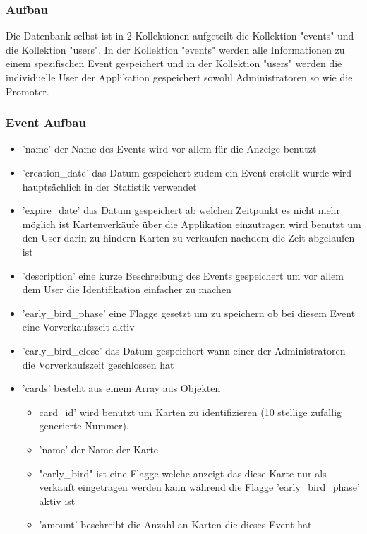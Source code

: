		\newpage
		
		\subsubsection{Aufbau}
			Die Datenbank selbst ist in 2 Kollektionen aufgeteilt die Kollektion "events" und die Kollektion "users". In der Kollektion "events" werden alle Informationen zu einem spezifischen Event gespeichert und in der Kollektion "users" werden die individuelle User der Applikation gespeichert sowohl Administratoren so wie die Promoter. 

			\subsubsection{Event Aufbau}			
				\begin{itemize}
					\item 'name' der Name des Events wird vor allem für die Anzeige benutzt
					\item 'creation\_date' das Datum gespeichert zudem ein Event erstellt wurde wird hauptsächlich in der Statistik verwendet
					\item 'expire\_date' das Datum gespeichert ab welchen Zeitpunkt es nicht mehr möglich ist Kartenverkäufe über die Applikation einzutragen wird benutzt um den User darin zu hindern Karten zu verkaufen nachdem die Zeit abgelaufen ist
					\item 'description' eine kurze Beschreibung des Events gespeichert um vor allem dem User die Identifikation einfacher zu machen
					\item 'early\_bird\_phase' eine Flagge gesetzt um zu speichern ob bei diesem Event eine Vorverkaufszeit aktiv
					\item 'early\_bird\_close' das Datum gespeichert wann einer der Administratoren die Vorverkaufszeit geschlossen hat
					\item 'cards' besteht aus einem Array aus Objekten
					\begin{itemize}
						\item card\_id' wird benutzt um Karten zu identifizieren (10 stellige zufällig generierte Nummer). 
						\item 'name' der Name der Karte
						\item "early\_bird" ist eine Flagge welche anzeigt das diese Karte nur als verkauft eingetragen werden kann während die Flagge 'early\_bird\_phase' aktiv ist
						\item 'amount' beschreibt die Anzahl an Karten die dieses Event hat

\end{itemize}
\end{itemize}
